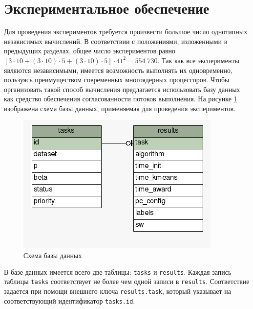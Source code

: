 \documentclass[12pt,twoside,a4paper,tikz,border=5]{refart}
\begin{document}
	\section{Экспериментальное обеспечение}
		Для проведения экспериментов требуется произвести большое число однотипных независимых вычислений. В соответствии с положениями, изложенными в предыдущих разделах, общее число экспериментов равно $ [3 \cdot 10+(3 \cdot 10) \cdot 5+(3 \cdot 10) \cdot 5] \cdot 41^2 = 554\; 730 $. Так как все эксперименты являются независимыми, имеется возможность выполнять их одновременно, пользуясь преимуществом современных многоядерных процессоров. Чтобы организовать такой способ вычисления предлагается использовать базу данных как средство обеспечения согласованности потоков выполнения. На рисунке \ref{fig:relationships} изображена схема базы данных, применяемая для проведения экспериментов. 
		\begin{figure}[!h]
			\begin{center}
				\includegraphics[scale=0.8]{img/relationships.png} 
			\end{center}
			\caption{Схема базы данных}
			\label{fig:relationships}
		\end{figure}
		
		В базе данных имеется всего две таблицы: \texttt{tasks} и \texttt{results}. Каждая запись таблицы \texttt{tasks} соответствует не более чем одной записи в \texttt{results}. Соответствие задается при помощи внешнего ключа \texttt{results.task}, который указывает на соответствующий идентификатор \texttt{tasks.id}. 
		
\end{document}
